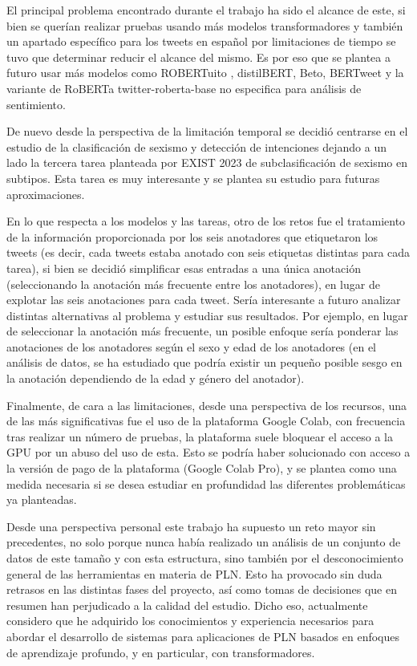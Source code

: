El principal problema encontrado durante el trabajo ha sido el alcance de este, si bien se querían realizar pruebas usando más modelos transformadores y también un apartado específico para los tweets en español por limitaciones de tiempo se tuvo que determinar reducir el alcance del mismo. Es por eso que se plantea a futuro usar más modelos como ROBERTuito , distilBERT, Beto, BERTweet y la variante de RoBERTa twitter-roberta-base no especifica para análisis de sentimiento.

De nuevo desde la perspectiva de la limitación temporal se decidió centrarse en el estudio de la clasificación de sexismo y detección de intenciones dejando a un lado la tercera tarea planteada por EXIST 2023 de subclasificación de sexismo en subtipos. Esta tarea es muy interesante y se plantea su estudio para futuras aproximaciones.

En lo que respecta a los modelos y las tareas, otro de los retos fue el tratamiento de la información proporcionada por los seis anotadores que etiquetaron los tweets (es decir, cada tweets estaba anotado con seis etiquetas distintas para cada tarea), si bien se decidió simplificar esas entradas a una única anotación (seleccionando la anotación más frecuente entre los anotadores), en lugar de explotar las seis anotaciones para cada tweet. Sería interesante a futuro analizar distintas alternativas al problema y estudiar sus resultados. Por ejemplo, en lugar de seleccionar la anotación más frecuente, un posible enfoque sería ponderar las anotaciones de los anotadores según el sexo y edad de los anotadores (en el análisis de datos, se ha estudiado que podría existir un pequeño posible sesgo en la anotación dependiendo de la edad y género del anotador). 

Finalmente, de cara a las limitaciones, desde una perspectiva de los recursos, una de las más significativas fue el uso de la plataforma Google Colab, con frecuencia tras realizar un número de pruebas, la plataforma suele bloquear el acceso a la GPU por un abuso del uso de esta. Esto se podría haber solucionado con acceso a la versión de pago de la plataforma (Google Colab Pro), y se plantea como una medida necesaria si se desea estudiar en profundidad las diferentes problemáticas ya planteadas.

Desde una perspectiva personal este trabajo ha supuesto un reto mayor sin precedentes, no solo porque nunca  había realizado un análisis de un conjunto de datos de este tamaño y con esta estructura, sino también por el desconocimiento general de las herramientas en materia de PLN. Esto ha provocado sin duda retrasos en las distintas fases del proyecto, así como tomas de decisiones que en resumen han perjudicado a la calidad del estudio. Dicho eso, actualmente considero que he adquirido los conocimientos y experiencia necesarios para abordar el desarrollo de sistemas para aplicaciones de PLN basados en enfoques de aprendizaje profundo, y en particular, con transformadores. 